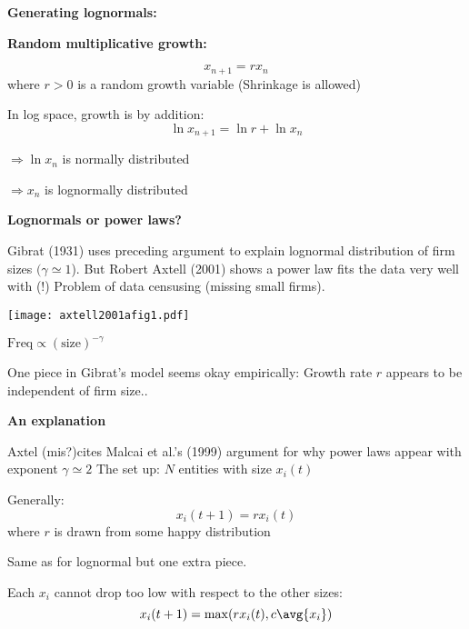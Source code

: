   \textbf{Generating lognormals:}

  \textbf{Random multiplicative growth:}
    
    
      $$ x_{n+1} = r x_n$$
      where $r>0$ is a random growth variable
     (Shrinkage is allowed)
    
      In log space, growth is by addition:
      $$ \ln x_{n+1} = \ln r + \ln x_n $$
    
      $\Rightarrow \ln x_{n}$ is normally distributed
      
      $\Rightarrow x_{n}$ is lognormally distributed
    
    
  


  \textbf{Lognormals or power laws?}

  
  
  
   Gibrat\cite{gibrat1931a} (1931) uses preceding argument
    to explain lognormal distribution of firm sizes $(\gamma \simeq 1$).
   But Robert Axtell\cite{axtell2001a} (2001) shows a power
    law fits the data very well with  (!)
   Problem of data censusing (missing small firms).
  
          
      
              
        
        \texttt{[image: axtell2001afig1.pdf]}
        
        $ \mbox{Freq} \propto (\mbox{size})^{-\gamma}$
        \medskip
            
    One piece in Gibrat's model seems okay empirically: 
    Growth rate $r$ appears to be independent of firm size.\cite{axtell2001a}.
  
  



  \textbf{An explanation}

  
  
   Axtel (mis?)cites Malcai et al.'s (1999) argument\cite{malcai1999a}
    for why power laws appear with exponent $\gamma \simeq 2$
   The set up: $N$ entities with size $x_i(t)$
   
    Generally:
    $$
    x_i(t+1) = rx_i(t) 
    $$
    where $r$ is drawn from some happy distribution
   
    Same as for lognormal but one extra piece.
   
    Each $x_i$ cannot drop too low with respect to the other sizes:
    $$
    x_i(t+1) = \max(rx_i(t),c\avg{x_i})
    $$
  
